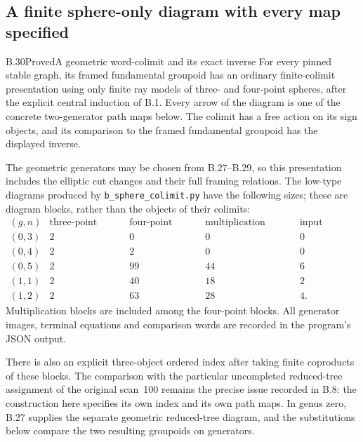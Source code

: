
\subsection{A finite sphere-only diagram with every map specified}

\begin{result}{B.30}{Proved}{A geometric word-colimit and its exact inverse}
For every pinned stable graph, its framed fundamental groupoid
has an ordinary finite-colimit presentation using only finite
ray models of three- and four-point spheres, after the explicit
central induction of B.1.  Every arrow of the diagram is one of
the concrete two-generator path maps below.  The colimit has a
free action on its sign objects, and its comparison to the
framed fundamental groupoid has the displayed inverse.

The geometric generators may be chosen from B.27--B.29, so
this presentation includes the elliptic cut changes and their
full framing relations.  The low-type diagrams produced by
\texttt{b\_sphere\_colimit.py} have the following sizes; these
are diagram blocks, rather than the objects of their colimits:
\[
\begin{array}{c|rrrr}
(g,n)&\text{three-point blocks}&\text{four-point blocks}
 &\text{multiplication blocks}&\text{input relators}\\\hline
(0,3)&2&0&0&0\\
(0,4)&2&2&0&0\\
(0,5)&2&99&44&6\\
(1,1)&2&40&18&2\\
(1,2)&2&63&28&4 .
\end{array}                                                     \tag{B.98}
\]
Multiplication blocks are included among the four-point blocks.
All generator images, terminal equations and comparison words
are recorded in the program's JSON output.

There is also an explicit three-object ordered index after
taking finite coproducts of these blocks.  The comparison with
the particular uncompleted reduced-tree assignment of the
original scan~100 remains the precise issue recorded in B.8:
the construction here specifies its own index and its own path
maps.  In genus zero, B.27 supplies the separate geometric
reduced-tree diagram, and the substitutions below compare the
two resulting groupoids on generators.
\end{result}

